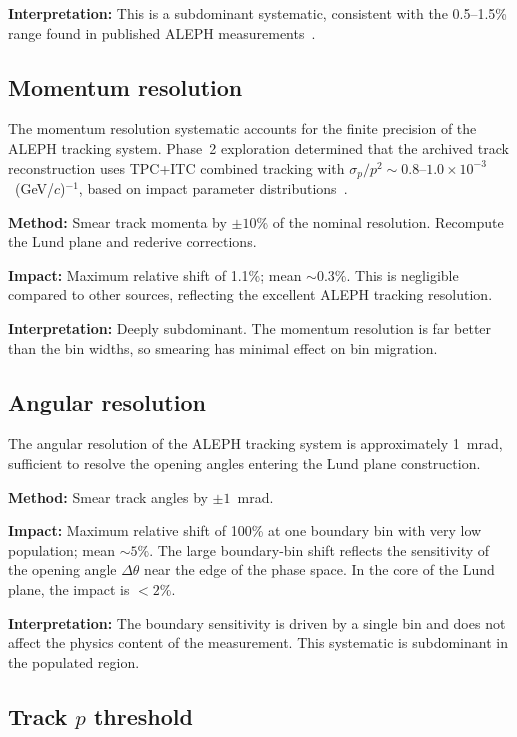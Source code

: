\documentclass[11pt,a4paper]{article}
\begin{document}
\textbf{Interpretation:} This is a subdominant systematic, consistent
with the 0.5--1.5\% range found in published ALEPH
measurements~\cite{ALEPH:1998vtv}.

\subsection{Momentum resolution}
\label{sec:syst-momentum}

The momentum resolution systematic accounts for the finite precision
of the ALEPH tracking system.  Phase~2 exploration determined that
the archived track reconstruction uses TPC+ITC combined tracking
with $\sigma_p / p^2 \sim 0.8$--$1.0 \times 10^{-3}$~(GeV/$c$)$^{-1}$,
based on impact parameter distributions~\cite{ALEPH:1995aqm}.

\textbf{Method:} Smear track momenta by $\pm 10\%$ of the nominal
resolution.  Recompute the Lund plane and rederive corrections.

\textbf{Impact:} Maximum relative shift of 1.1\%; mean $\sim\!0.3\%$.
This is negligible compared to other sources, reflecting the excellent
ALEPH tracking resolution.

\textbf{Interpretation:} Deeply subdominant.  The momentum resolution
is far better than the bin widths, so smearing has minimal effect on
bin migration.

\subsection{Angular resolution}
\label{sec:syst-angular}

The angular resolution of the ALEPH tracking system is approximately
1~mrad, sufficient to resolve the opening angles entering the Lund
plane construction.

\textbf{Method:} Smear track angles by $\pm 1$~mrad.

\textbf{Impact:} Maximum relative shift of 100\% at one boundary bin
with very low population; mean $\sim\!5\%$.  The large boundary-bin
shift reflects the sensitivity of the opening angle $\Delta\theta$
near the edge of the phase space.  In the core of the Lund plane,
the impact is $<\!2\%$.

\textbf{Interpretation:} The boundary sensitivity is driven by a single
bin and does not affect the physics content of the measurement.  This
systematic is subdominant in the populated region.

\subsection{Track $p$ threshold}
\label{sec:syst-p-threshold}
\end{document}
